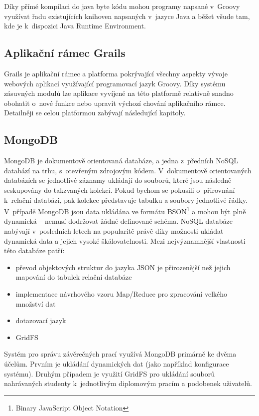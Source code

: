 Díky přímé kompilaci do java byte kódu mohou programy napsané v~Groovy využívat řadu existujících knihoven napsaných v~jazyce Java a běžet všude tam, kde je k~dispozici Java Runtime Environment\cite{groovy-in-action}.

\subsection{Aplikační rámec Grails}
Grails je aplikační rámec a platforma pokrývající všechny aspekty vývoje webových aplikací využívající programovací jazyk Groovy\cite{grails-homepage}. Díky systému zásuvných modulů lze aplikace vyvíjené na této platformě relativně snadno obohatit o~nové funkce nebo upravit výchozí chování aplikačního rámce. Detailněji se celou platformou zabývají následující kapitoly.

\subsection{MongoDB}
MongoDB je dokumentově orientovaná databáze, a jedna z~předních NoSQL databází na trhu, s~otevřeným zdrojovým kódem\cite{mongo-homepage}. V~dokumentově orientovaných databázích se jednotlivé záznamy ukládají do souborů, které jsou následně seskupovány do takzvaných kolekcí. Pokud bychom se pokusili o~přirovnání k~relační databázi, pak kolekce představuje tabulku a soubory jednotlivé řádky. V~případě MongoDB jsou data ukládána ve formátu BSON\footnote{Binary JavaScript Object Notation} a mohou být plně dynamická -- nemusí dodržovat žádné definované schéma. NoSQL databáze nabývají v~posledních letech na popularitě právě díky možnosti ukládat dynamická data a jejich vysoké škálovatelnosti. Mezi nejvýznamnější vlastnosti této databáze patří:

\begin{itemize}
\item převod objektových struktur do jazyka JSON je přirozenější než jejich mapování do tabulek relační databáze
\item implementace návrhového vzoru Map/Reduce pro zpracování velkého množství dat
\item dotazovací jazyk
\item GridFS
\end{itemize}

Systém pro správu závěrečných prací využívá MongoDB primárně ke dvěma účelům. Prvním je ukládání dynamických dat (jako například konfigurace systému). Druhým případem je využití GridFS pro ukládání souborů nahrávaných studenty k~jednotlivým diplomovým pracím a podobenek uživatelů.


